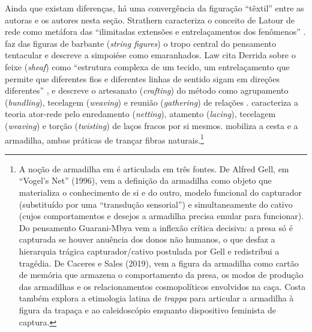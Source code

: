 Ainda que existam diferenças, há uma convergência da figuração \enquote{têxtil} entre as autoras e os autores nesta seção. Strathern caracteriza o conceito de Latour de rede como metáfora das \enquote{ilimitadas extensões e entrelaçamentos dos fenômenos} \parencite[p.~7]{strathern2011cortando}. \textcite{Haraway2023Ficar} faz das figuras de barbante (\textit{string figures}) o tropo central do pensamento tentacular e descreve a simpoiése como emaranhados. Law cita Derrida sobre o feixe (\textit{sheaf}) como \enquote{estrutura complexa de um tecido, um entrelaçamento que permite que diferentes fios e diferentes linhas de sentido sigam em direções diferentes} \parencite[p.~41]{Law2004After}, e descreve o artesanato (\textit{crafting}) do método como agrupamento (\textit{bundling}), tecelagem (\textit{weaving}) e reunião (\textit{gathering}) de relações \parencite[pp.~41--42, 144]{Law2004After}. \textcite[p.~3]{latour1996clarifications} caracteriza a teoria ator-rede pelo enredamento (\textit{netting}), atamento (\textit{lacing}), tecelagem (\textit{weaving}) e torção (\textit{twisting}) de laços fracos por si mesmos. \textcite{costa2024manchando} mobiliza a cesta e a armadilha, ambas práticas de trançar fibras naturais.\footnote{A noção de armadilha em \textcite[pp.~306--309]{costa2024manchando} é articulada em três fontes. De Alfred Gell, em \enquote{Vogel's Net} (1996), vem a definição da armadilha como objeto que materializa o conhecimento de si e do outro, modelo funcional do capturador (substituído por uma \enquote{transdução sensorial}) e simultaneamente do cativo (cujos comportamentos e desejos a armadilha precisa emular para funcionar). Do pensamento Guarani-Mbya vem a inflexão crítica decisiva: a presa só é capturada se houver anuência dos donos não humanos, o que desfaz a hierarquia trágica capturador/cativo postulada por Gell e redistribui a tragédia. De Caceres e Sales (2019), vem a figura da armadilha como cartão de memória que armazena o comportamento da presa, os modos de produção das armadilhas e os relacionamentos cosmopolíticos envolvidos na caça. Costa também explora a etimologia latina de \textit{trappa} para articular a armadilha à figura da trapaça e ao caleidoscópio enquanto dispositivo feminista de captura.}

